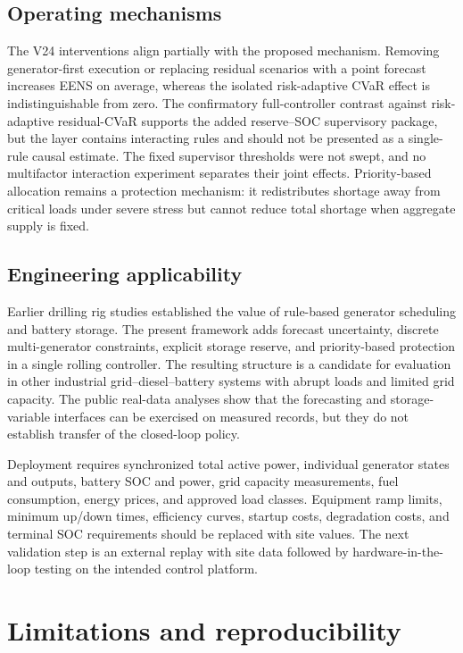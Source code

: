 \subsection{Operating mechanisms}\label{operating-mechanisms}

The V24 interventions align partially with the proposed mechanism. Removing
generator-first execution or replacing residual scenarios with a point forecast
increases EENS on average, whereas the isolated risk-adaptive CVaR effect is
indistinguishable from zero. The confirmatory full-controller contrast against
risk-adaptive residual-CVaR supports the added reserve--SOC supervisory package,
but the layer contains interacting rules and should not be presented as a
single-rule causal estimate. The fixed supervisor thresholds were not swept,
and no multifactor interaction experiment separates their joint effects.
Priority-based allocation remains a protection
mechanism: it redistributes shortage away from critical loads under severe
stress but cannot reduce total shortage when aggregate supply is fixed.

\subsection{Engineering applicability}\label{engineering-applicability}

Earlier drilling rig studies established the value of rule-based generator
scheduling and battery storage. The present framework adds forecast
uncertainty, discrete multi-generator constraints, explicit storage reserve,
and priority-based protection in a single rolling controller. The resulting
structure is a candidate for evaluation in other industrial
grid--diesel--battery systems with abrupt loads and limited grid capacity. The
public real-data analyses show that the forecasting and storage-variable
interfaces can be exercised on measured records, but they do not establish
transfer of the closed-loop policy.

Deployment requires synchronized total active power, individual generator
states and outputs, battery SOC and power, grid capacity measurements, fuel
consumption, energy prices, and approved load classes. Equipment ramp limits,
minimum up/down times, efficiency curves, startup costs, degradation costs,
and terminal SOC requirements should be replaced with site values. The next
validation step is an external replay with site data followed by
hardware-in-the-loop testing on the intended control platform.

\section{Limitations and reproducibility}\label{limitations-and-reproducibility}

